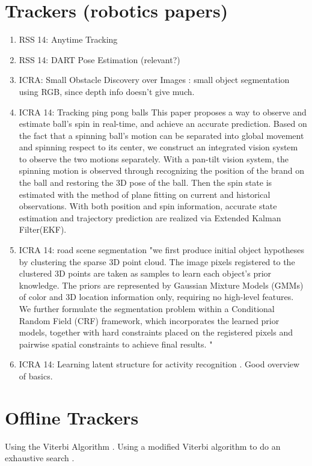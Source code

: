 \section{Trackers (robotics papers)}
\label{sec:trackers}
\begin{enumerate}
\item RSS 14: Anytime Tracking \cite{held2014combining}
\item RSS 14: DART Pose Estimation \cite{schmidt2014dart} (relevant?)
\item ICRA: Small Obstacle Discovery over Images \cite{kumar2014markov}: small object segmentation using RGB, since depth info doesn't give much.
\item ICRA 14: Tracking ping pong balls \cite{zhang2014spin} This paper proposes a way to observe and estimate ball's spin in real-time, and achieve an accurate prediction. Based on the fact that a spinning ball's motion can be separated into global movement and spinning respect to its center, we construct an integrated vision system to observe the two motions separately. With a pan-tilt vision system, the spinning motion is observed through recognizing the position of the brand on the ball and restoring the 3D pose of the ball. Then the spin state is estimated with the method of plane fitting on current and historical observations. With both position and spin information, accurate state estimation and trajectory prediction are realized via Extended Kalman Filter(EKF). 
\item ICRA 14: road scene segmentation \cite{huang2014road} "we first produce initial object hypotheses by clustering the sparse 3D point cloud. The image pixels registered to the clustered 3D points are taken as samples to learn each object's prior knowledge. The priors are represented by Gaussian Mixture Models (GMMs) of color and 3D location information only, requiring no high-level features. We further formulate the segmentation problem within a Conditional Random Field (CRF) framework, which incorporates the learned prior models, together with hard constraints placed on the registered pixels and pairwise spatial constraints to achieve final results. "
\item ICRA 14: Learning latent structure for activity recognition \cite{hu2014learning}. Good overview of basics.
\end{enumerate}

\section{Offline Trackers}
\label{sec:offlinetrackers}
Using the Viterbi Algorithm \cite{kraussling2008tracking}. Using a modified Viterbi algorithm to do an exhaustive search \cite{tonissen1996peformance}.


